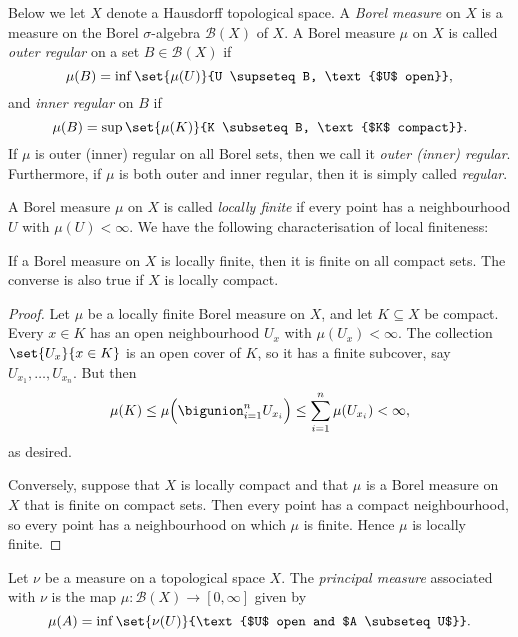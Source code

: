 \documentclass[article, a4paper, 11pt, oneside]{memoir}
\numberwithin{equation}{chapter}
\newcommand{\calB}{\mathcal{B}}
\newcommand{\borel}[1]{\calB(#1)}
\begin{document}
Below we let $X$ denote a Hausdorff topological space. A \emph{Borel measure} on $X$ is a measure on the Borel $\sigma$-algebra $\borel{X}$ of $X$. A Borel measure $\mu$ on $X$ is called \emph{outer regular} on a set $B \in \borel{X}$ if
%
\begin{equation*}
    \mu(B)
        = \inf \set{\mu(U)}{U \supseteq B, \text{$U$ open}},
\end{equation*}
%
and \emph{inner regular} on $B$ if
%
\begin{equation*}
    \mu(B)
        = \sup \set{\mu(K)}{K \subseteq B, \text{$K$ compact}}.
\end{equation*}
%
If $\mu$ is outer (inner) regular on all Borel sets, then we call it \emph{outer (inner) regular}. Furthermore, if $\mu$ is both outer and inner regular, then it is simply called \emph{regular}.

A Borel measure $\mu$ on $X$ is called \emph{locally finite} if every point has a neighbourhood $U$ with $\mu(U) < \infty$. We have the following characterisation of local finiteness:

\begin{proposition}
    \label{thm:local-finiteness-compacts}
    If a Borel measure on $X$ is locally finite, then it is finite on all compact sets. The converse is also true if $X$ is locally compact.
\end{proposition}

\begin{proof}
    Let $\mu$ be a locally finite Borel measure on $X$, and let $K \subseteq X$ be compact. Every $x \in K$ has an open neighbourhood $U_x$ with $\mu(U_x) < \infty$. The collection $\set{U_x}{x \in K}$ is an open cover of $K$, so it has a finite subcover, say $U_{x_1}, \ldots, U_{x_n}$. But then
    \begin{equation*}
        \mu(K)
            \leq \mu \Bigl( \bigunion_{i=1}^n U_{x_i} \Bigr)
            \leq \sum_{i=1}^n \mu(U_{x_i})
            < \infty,
    \end{equation*}
    as desired.

    Conversely, suppose that $X$ is locally compact and that $\mu$ is a Borel measure on $X$ that is finite on compact sets. Then every point has a compact neighbourhood, so every point has a neighbourhood on which $\mu$ is finite. Hence $\mu$ is locally finite.
\end{proof}



\begin{definition}
    Let $\nu$ be a measure on a topological space $X$. The \emph{principal measure}\footnotemark{} associated with $\nu$ is the map $\mu \colon \borel{X} \to [0,\infty]$ given by
    \begin{equation*}
        \mu(A)
            = \inf \set{\nu(U)}{\text{$U$ open and $A \subseteq U$}}.
    \end{equation*}
\end{definition}
\end{document}

